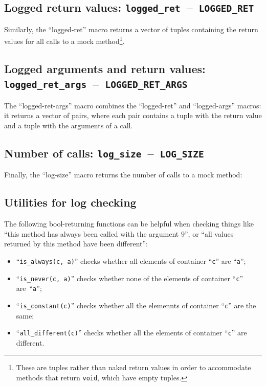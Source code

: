 \documentclass[twoside, a4paper, article]{memoir}
\newcommand*\testudocolor{\color{red!80!blue}}
\newcommand*\testudo[1]{\texttt{\testudocolor{}#1}}
\newcommand*\testudopair[2]{\testudo{#1}~--~\testudo{#2}}
\newcommand\subsectiontestudopair[3]{%
  \subsection[#1]{#1: \testudopair{#2}{#3}}}
\newcommand\typesetexample[1]{%
  \typesetexamplesource{#1}
}
\providecommand\typesetexamplesource[1]{%
}
\begin{document}
\subsectiontestudopair{Logged return values}{logged\_ret}{LOGGED\_RET}

Similarly, the ``logged-ret'' macro returns a vector of tuples containing the
return values for all calls to a mock method\footnote{These are tuples rather
  than naked return values in order to accommodate methods that return
  \texttt{void}, which have empty tuples.}.

\typesetexample{check-mock-method-logs-return-values}

\subsectiontestudopair{Logged arguments and return values}%
  {logged\_ret\_args}{LOGGED\_RET\_ARGS}

The ``logged-ret-args'' macro combines the ``logged-ret'' and ``logged-args''
macros: it returns a vector of pairs, where each pair contains a tuple with the
return value and a tuple with the arguments of a call.

\typesetexample{check-mock-method-logs-return-arguments-values}

\subsectiontestudopair{Number of calls}{log\_size}{LOG\_SIZE}
\label{sec:mock-method-number-of-calls}

Finally, the ``log-size'' macro returns the number of calls to a mock method:

\typesetexample{check-mock-method-logs-number-of-calls}


\subsection{Utilities for log checking}
\label{sec:utilities-log-checking}

The following bool-returning functions can be helpful when checking things like
``this method has always been called with the argument $9$'', or ``all values
returned by this method have been different'':
\begin{itemize}
\item ``\texttt{is\_always(c, a)}'' checks whether all elements of container
  ``\texttt{c}'' are ``\texttt{a}'';
\item ``\texttt{is\_never(c, a)}'' checks whether none of the elements of
  container ``\texttt{c}'' are~``\texttt{a}'';
\item ``\texttt{is\_constant(c)}'' checks whether all the elemennts of
  container ``\texttt{c}'' are the same;
\item ``\texttt{all\_different(c)}'' checks whether all the elements of
  container ``\texttt{c}'' are different.
\end{itemize}
\end{document}

